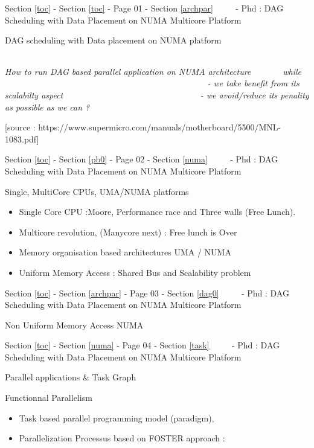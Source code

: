 \documentclass[11pt]{article}
\providecommand{\tightlist}{%
      \setlength{\itemsep}{0pt}\setlength{\parskip}{0pt}}
\begin{document}
     {Section \ref{toc} - Section \ref{toc} - Page 01 -
Section \ref{archpar} ~~~~ - Phd : DAG Scheduling with Data Placement on
NUMA Multicore Platform}

DAG scheduling with Data placement on NUMA platform

\begin{longtable}[]{@{}l@{}}
\toprule
\bottomrule
\end{longtable}

\textbar{}

\emph{How to run DAG based parallel application on NUMA architecture
~~~~~~ while ~~~~~~ ~~~~~~ ~~~~~~ ~~~~~~ ~~~~~~ ~~~~~~ ~~~~~~ - we take
benefit from its scalabilty aspect ~~~~~~ ~~~~~~ ~~~~~~~~~~~~~~~~~ - we
avoid/reduce its penality as possible as we can ?~~~~~~ ~~~~~~}

\textbar{} {[}source :
https://www.supermicro.com/manuals/motherboard/5500/MNL-1083.pdf{]} 

     {Section \ref{toc} - Section \ref{pb0} - Page 02 - Section \ref{numa}
~~~~ - Phd : DAG Scheduling with Data Placement on NUMA Multicore
Platform}

Single, MultiCore CPUs, UMA/NUMA platforms

\begin{itemize}
\tightlist
\item
  Single Core CPU :Moore, Performance race and Three walls (Free Lunch).
\item
  Multicore revolution, (Manycore next) : Free lunch is Over 
\item
  Memory organisation based architectures UMA / NUMA
\item
  Uniform Memory Access : Shared Bus and Scalability problem 
\end{itemize}

     {Section \ref{toc} - Section \ref{archpar} - Page 03 -
Section \ref{dag0} ~~~~ - Phd : DAG Scheduling with Data Placement on
NUMA Multicore Platform}

Non Uniform Memory Access NUMA

 

     {Section \ref{toc} - Section \ref{numa} - Page 04 - Section \ref{task}
~~~~ - Phd : DAG Scheduling with Data Placement on NUMA Multicore
Platform}

Parallel applications \& Task Graph

Functionnal Parallelism

\begin{itemize}
\tightlist
\item
  Task based parallel programming model (paradigm), 
\item
  Parallelization Processus based on FOSTER approach :
\end{itemize}
\end{document}
